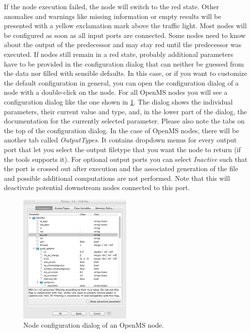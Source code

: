If the node execution failed, the node will switch to the red state. Other anomalies and warnings like missing information or empty results 
will be presented with a yellow exclamation mark above the traffic light.
Most nodes will be configured as soon as all input ports are connected. Some nodes need to know about the output of the predecessor and may stay red until the predecessor was executed.
If nodes still remain in a red state, probably additional parameters have to be provided in the configuration dialog that can neither be guessed from the data nor filled with sensible defaults.
In this case, or if you want to customize the default configuration in general, you can open the configuration dialog of a node with a double-click on the node.
For all OpenMS nodes you will see a configuration dialog like the one shown in \cref{fig:knime_configure}.
The dialog shows the individual parameters, their current value and type, and, in the lower part of the dialog, the 
documentation for the currently selected parameter. Please also note the tabs on the top of the configuration dialog. 
In the case of OpenMS nodes, there will be another tab called \textit{OutputTypes}. It contains dropdown menus for 
every output port that let you select the output filetype that you want the node to return (if the tools supports 
it). For optional output ports you can select \textit{Inactive} such that the port is crossed out after execution and 
the associated generation of the file and possible additional computations are not performed. Note that this will 
deactivate potential downstream nodes connected to this port.

\begin{figure}
\centering
\includegraphics[width=0.5\textwidth]{graphics/knime_setup/knime_configure_dialog}
\caption{Node configuration dialog of an OpenMS node.}
\label{fig:knime_configure}
\end{figure}

